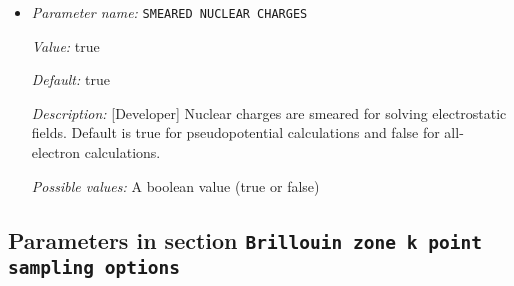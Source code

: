 \begin{itemize}
{\it Value:} 0.0


{\it Default:} 0.0


{\it Description:} [Advanced] The radius (in a.u) of the ball around an atom in which self-potential of the associated nuclear charge is solved. For the default value of 0.0, the radius value is automatically determined to accommodate the largest radius possible for the given finite element mesh. The default approach works for most problems.


{\it Possible values:} A floating point number $v$ such that $0 \leq v \leq 50$
\item {\it Parameter name:} {\tt SMEARED NUCLEAR CHARGES}
\label{parameters:Boundary conditions/SMEARED NUCLEAR CHARGES}
\label{parameters:Boundary_20conditions/SMEARED_20NUCLEAR_20CHARGES}


{\it Value:} true


{\it Default:} true


{\it Description:} [Developer] Nuclear charges are smeared for solving electrostatic fields. Default is true for pseudopotential calculations and false for all-electron calculations.


{\it Possible values:} A boolean value (true or false)
\end{itemize}

\subsection{Parameters in section \tt Brillouin zone k point sampling options}
\label{parameters:Brillouin_20zone_20k_20point_20sampling_20options}

